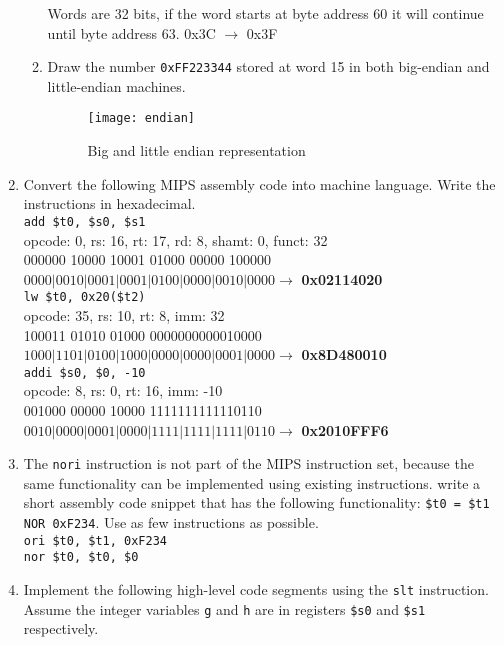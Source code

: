 \documentclass[a4paper]{article}
\begin{document}
\begin{enumerate}
\begin{enumerate}
					Words are 32 bits, if the word starts at byte address 60
					it will continue until byte address 63. 0x3C $\to$ 0x3F
				\item Draw the number \texttt{0xFF223344} stored at word 15
					in both big-endian and little-endian machines.
					\begin{figure}[ht!]
						\centering
						\texttt{[image: endian]}
						\caption{Big and little endian representation}
						\label{fig:endian}
					\end{figure}	
			\end{enumerate}
		\item Convert the following MIPS assembly code into machine language. Write
			the instructions in hexadecimal.\\
			\texttt{add \$t0, \$s0, \$s1}\\
			opcode: 0, rs: 16, rt: 17, rd: 8, shamt: 0, funct: 32\\
			000000 10000 10001 01000 00000 100000\\
			$0000|0010|0001|0001|0100|0000|0010|0000 \to$ \textbf{0x02114020}\\
			\texttt{lw \$t0, 0x20(\$t2)}\\
			opcode: 35, rs: 10, rt: 8, imm: 32\\
			100011 01010 01000 0000000000010000\\
			$1000|1101|0100|1000|0000|0000|0001|0000 \to$ \textbf{0x8D480010}\\
			\texttt{addi \$s0, \$0, -10}\\
			opcode: 8, rs: 0, rt: 16, imm: -10\\
			001000 00000 10000 1111111111110110\\
			$0010|0000|0001|0000|1111|1111|1111|0110 \to$ \textbf{0x2010FFF6}
		\pagebreak
		\item The \texttt{nori} instruction is not part of the MIPS instruction set,
			because the same functionality can be implemented using existing instructions.
			write a short assembly code snippet that has the following functionality:
			\texttt{\$t0 = \$t1 NOR 0xF234}. Use as few instructions as possible.\\
			\texttt{ori \$t0, \$t1, 0xF234\\
				nor \$t0, \$t0, \$0}\\
		\item Implement the following high-level code segments using the \texttt{slt}
			instruction. Assume the integer variables \texttt{g} and \texttt{h} are
			in registers \texttt{\$s0} and \texttt{\$s1} respectively.\\

\end{enumerate}
\end{document}
